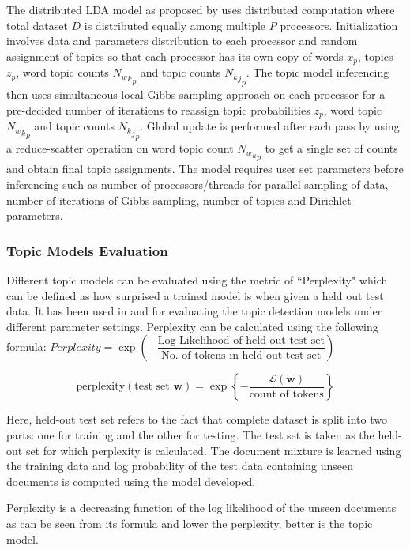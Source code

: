 The distributed LDA model as proposed by \cite{newman2009distributed} uses distributed computation where total dataset $D$ is distributed equally among multiple $P$ processors. Initialization involves data and parameters distribution to each processor and random assignment of topics so that each processor has its own copy of words $x_p$, topics $z_p$, word topic counts ${{N_w}_k}_p$ and topic counts ${{N_k}_j}_p$. 
The topic model inferencing then uses simultaneous local Gibbs sampling approach on each processor for a pre-decided number of iterations to reassign topic probabilities $z_p$, word topic ${{N_w}_k}_p$ and topic counts ${{N_k}_j}_p$.
Global update is performed after each pass by using a reduce-scatter operation on word topic count ${{N_w}_k}_p$ to get a single set of counts and obtain final topic assignments.
The model requires user set parameters before inferencing such as number of processors/threads for parallel sampling of data, number of iterations of Gibbs sampling, number of topics and Dirichlet parameters. 

\subsubsection{Topic Models Evaluation}

 Different topic models can be evaluated using the metric of ``Perplexity" which can be defined as how surprised a trained model is when given a held out test data. It has been used in \cite{newman2009distributed} and \cite{blei2003latent} for evaluating the topic detection models under different parameter settings. Perplexity can be calculated using the following formula:
$Perplexity= \exp(-\dfrac{\text{Log Likelihood of held-out test set}}{\text{No. of tokens in held-out test set}})$

 $$ \text{perplexity}(\text{test set } \boldsymbol w) = \exp \left\{ - \frac{\mathcal L(\boldsymbol w)}{\text{count of tokens}} \right\} $$

Here, held-out test set refers to the fact that complete dataset is split into two parts: one for training and the other for testing. The test set is taken as the held-out set for which perplexity is calculated. The document mixture is learned using the training data and log probability of the test data containing unseen documents is computed using the model developed.

Perplexity is a decreasing function of the log likelihood of the unseen documents as can be seen from its formula and lower the perplexity, better is the topic model.


